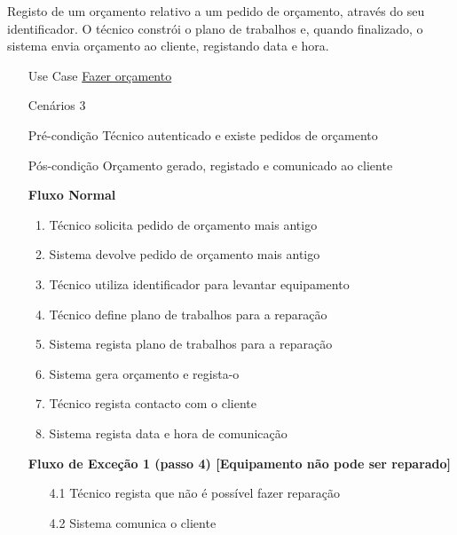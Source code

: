 \documentclass[../relatorio.tex]{subfiles}
\begin{document}
Registo de um orçamento relativo a um pedido de orçamento, através do seu identificador.
O técnico constrói o plano de trabalhos e, quando finalizado, o sistema envia orçamento ao cliente,
registando data e hora.
\begin{itemize}
    \item[Use Case] {\underline{Fazer orçamento}}
    \item[Cenários] {3}
    \item[Pré-condição] {Técnico autenticado e existe pedidos de orçamento}
    \item[Pós-condição] {Orçamento gerado, registado e comunicado ao cliente}
          \begin{flushleft}
              \textbf{Fluxo Normal}
          \end{flushleft}
          \begin{enumerate}
              \item Técnico solicita pedido de orçamento mais antigo
              \item Sistema devolve pedido de orçamento mais antigo
              \item Técnico utiliza identificador para levantar equipamento
              \item Técnico define plano de trabalhos para a reparação
              \item Sistema regista plano de trabalhos para a reparação
              \item Sistema gera orçamento e regista-o
              \item Técnico regista contacto com o cliente
              \item Sistema regista data e hora de comunicação
          \end{enumerate}
          \begin{flushleft}
              \textbf{Fluxo de Exceção 1 (passo 4) [Equipamento não pode ser reparado]}
          \end{flushleft}
          \begin{itemize}
              \item[4.1] {Técnico regista que não é possível fazer reparação}
              \item[4.2] {Sistema comunica o cliente}
          \end{itemize}
\end{itemize}
\end{document}
